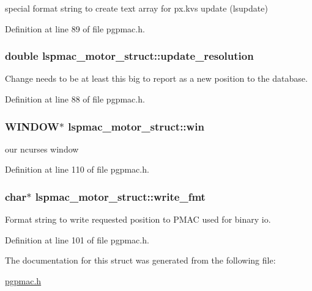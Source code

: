 special format string to create text array for px.kvs update (lsupdate) 

Definition at line 89 of file pgpmac.h.\hypertarget{structlspmac__motor__struct_a18386126b724d9c7f72364db126f5b93}{
\subsubsection[{update\_\-resolution}]{\setlength{\rightskip}{0pt plus 5cm}double {\bf lspmac\_\-motor\_\-struct::update\_\-resolution}}}
\label{structlspmac__motor__struct_a18386126b724d9c7f72364db126f5b93}


Change needs to be at least this big to report as a new position to the database. 

Definition at line 88 of file pgpmac.h.\hypertarget{structlspmac__motor__struct_a133775154b0e008f3a2fde6f53bc0eff}{
\subsubsection[{win}]{\setlength{\rightskip}{0pt plus 5cm}WINDOW$\ast$ {\bf lspmac\_\-motor\_\-struct::win}}}
\label{structlspmac__motor__struct_a133775154b0e008f3a2fde6f53bc0eff}


our ncurses window 

Definition at line 110 of file pgpmac.h.\hypertarget{structlspmac__motor__struct_a70291ddfe7994c0bec7fc2287cb6dd89}{
\subsubsection[{write\_\-fmt}]{\setlength{\rightskip}{0pt plus 5cm}char$\ast$ {\bf lspmac\_\-motor\_\-struct::write\_\-fmt}}}
\label{structlspmac__motor__struct_a70291ddfe7994c0bec7fc2287cb6dd89}


Format string to write requested position to PMAC used for binary io. 

Definition at line 101 of file pgpmac.h.

The documentation for this struct was generated from the following file:\begin{DoxyCompactItemize}
\item 
\hyperlink{pgpmac_8h}{pgpmac.h}\end{DoxyCompactItemize}
